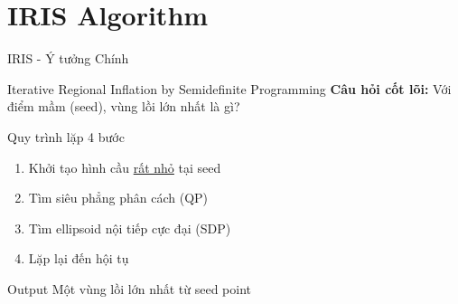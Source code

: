 \documentclass[aspectratio=169]{beamer}
\begin{document}
\section{IRIS Algorithm}

\begin{frame}{IRIS - Ý tưởng Chính}

    \begin{block}{Iterative Regional Inflation by Semidefinite Programming}
        \textbf{Câu hỏi cốt lõi:} Với điểm mầm (seed), vùng lồi lớn nhất là gì?
    \end{block}

    \begin{exampleblock}{Quy trình lặp 4 bước}
        \begin{enumerate}
            \item Khởi tạo hình cầu \underline{rất nhỏ} tại seed
            \item Tìm siêu phẳng phân cách (QP)
            \item Tìm ellipsoid nội tiếp cực đại (SDP)
            \item Lặp lại đến hội tụ
        \end{enumerate}
    \end{exampleblock}

    \begin{alertblock}{Output}
        Một vùng lồi lớn nhất từ seed point
    \end{alertblock}

\end{frame}
\end{document}
